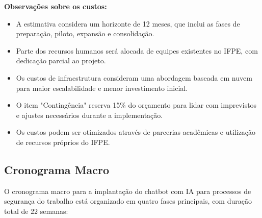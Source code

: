 \documentclass[12pt,a4paper]{article}
\begin{document}
\textbf{Observações sobre os custos:}

\begin{itemize}
    \item A estimativa considera um horizonte de 12 meses, que inclui as fases de preparação, piloto, expansão e consolidação.
    \item Parte dos recursos humanos será alocada de equipes existentes no IFPE, com dedicação parcial ao projeto.
    \item Os custos de infraestrutura consideram uma abordagem baseada em nuvem para maior escalabilidade e menor investimento inicial.
    \item O item "Contingência" reserva 15\% do orçamento para lidar com imprevistos e ajustes necessários durante a implementação.
    \item Os custos podem ser otimizados através de parcerias acadêmicas e utilização de recursos próprios do IFPE.
\end{itemize}

\subsection{Cronograma Macro}

O cronograma macro para a implantação do chatbot com IA para processos de segurança do trabalho está organizado em quatro fases principais, com duração total de 22 semanas:
\end{document}
